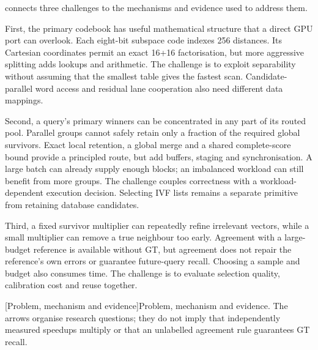  connects three challenges to the mechanisms and
evidence used to address them.

First, the primary codebook has useful mathematical structure that a direct
GPU port can overlook. Each eight-bit subspace code indexes 256 distances.
Its Cartesian coordinates permit an exact 16+16 factorisation, but more
aggressive splitting adds lookups and arithmetic. The challenge is to exploit
separability without assuming that the smallest table gives the fastest
scan. Candidate-parallel word access and residual lane cooperation also need
different data mappings.

Second, a query's primary winners can be concentrated in any part of its
routed pool. Parallel groups cannot safely retain only a fraction of the
required global survivors. Exact local retention, a global merge and a
shared complete-score bound provide a principled route, but add buffers,
staging and synchronisation. A large batch can already supply enough blocks;
an imbalanced workload can still benefit from more groups. The challenge
couples correctness with a workload-dependent execution decision. Selecting
IVF lists remains a separate primitive from retaining database candidates.

Third, a fixed survivor multiplier can repeatedly refine irrelevant vectors,
while a small multiplier can remove a true neighbour too early. Agreement
with a large-budget reference is available without GT, but agreement does
not repair the reference's own errors or guarantee future-query recall.
Choosing a sample and budget also consumes time. The challenge is to evaluate
selection quality, calibration cost and reuse together.

\par\medskip\noindent\begin{minipage}{\linewidth}
\centering\captionsetup{hypcap=false}
\resizebox{\linewidth}{!}{}
[Problem, mechanism and evidence]{Problem, mechanism and evidence. The arrows organise
research questions; they do not imply that independently measured speedups
multiply or that an unlabelled agreement rule guarantees GT recall.}
\label{fig:1-challenges}
\end{minipage}\par\medskip

